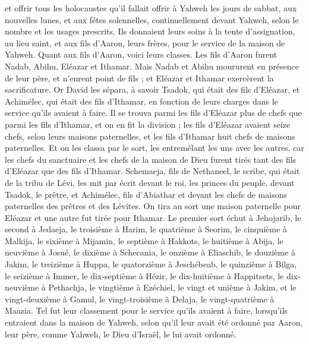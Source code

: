 \begin{multicols}{2}
et offrir tous les holocaustes qu'il fallait offrir à Yahweh les jours de sabbat, aux nouvelles lunes, et aux fêtes solennelles, continuellement devant Yahweh, selon le nombre et les usages prescrits.
Ils donnaient leurs soins à la tente d'assignation, au lieu saint, et aux fils d'Aaron, leurs frères, pour le service de la maison de Yahweh.
\VerseOne{}Quant aux fils d'Aaron, voici leurs classes. Les fils d'Aaron furent Nadab, Abihu, Eléazar et Ithamar.
Mais Nadab et Abihu moururent en présence de leur père, et n'eurent point de fils ; et Eléazar et Ithamar exercèrent la sacrificature.
Or David les sépara, à savoir Tsadok, qui était des fils d'Eléazar, et Achimélec, qui était des fils d'Ithamar, en fonction de leurs charges dans le service qu'ils avaient à faire.
Il se trouva parmi les fils d'Eléazar plus de chefs que parmi les fils d'Ithamar, et on en fit la division ; les fils d'Eléazar avaient seize chefs, selon leurs maisons paternelles, et les fils d'Ithamar huit chefs de maisons paternelles.
Et on les classa par le sort, les entremêlant les uns avec les autres, car les chefs du sanctuaire et les chefs de la maison de Dieu furent tirés tant des fils d'Eléazar que des fils d'Ithamar.
Schemaeja, fils de Nethaneel, le scribe, qui était de la tribu de Lévi, les mit par écrit devant le roi, les princes du peuple, devant Tsadok, le prêtre, et Achimélec, fils d'Abiathar et devant les chefs de maisons paternelles des prêtres et des Lévites. On tira au sort une maison paternelle pour Eléazar et une autre fut tirée pour Ithamar.
Le premier sort échut à Jehojarib, le second à Jedaeja,
le troisième à Harim, le quatrième à Seorim,
le cinquième à Malkija, le sixième à Mijamin,
le septième à Hakkots, le huitième à Abija,
le neuvième à Josué, le dixième à Schecania,
le onzième à Eliaschib, le douzième à Jakim,
le treizième à Huppa, le quatorzième à Jeschébeab,
le quinzième à Bilga, le seizième à Immer,
le dix-septième à Hézir, le dix-huitième à Happitsets,
le dix-neuvième à Pethachja, le vingtième à Ezéchiel,
le vingt et unième à Jakim, et le vingt-deuxième à Gamul,
le vingt-troisième à Delaja, le vingt-quatrième à Maazia.
Tel fut leur classement pour le service qu'ils avaient à faire, lorsqu'ils entraient dans la maison de Yahweh, selon qu'il leur avait été ordonné par Aaron, leur père, comme Yahweh, le Dieu d'Israël, le lui avait ordonné.

\end{multicols}
